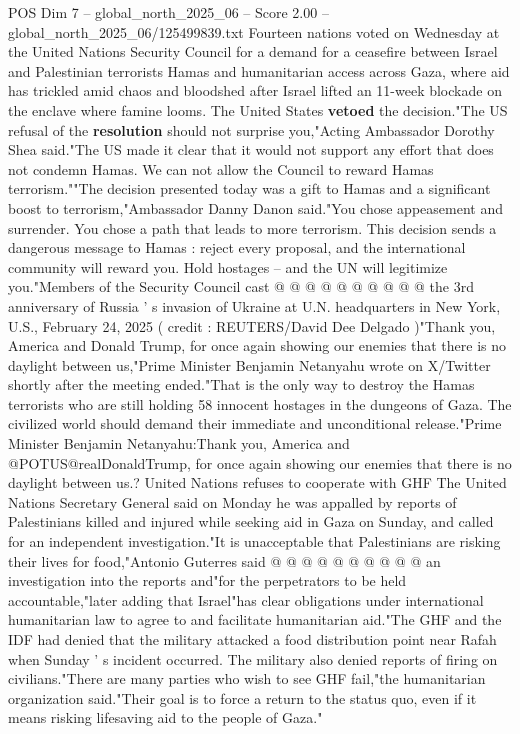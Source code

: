 \begin{textsample}{POS Dim 7 – global\_north\_2025\_06 – Score 2.00 – global\_north\_2025\_06/125499839.txt}  \label{ex:f7_pos_373}
Fourteen nations voted on Wednesday at the United Nations Security Council for a demand for a ceasefire between Israel and Palestinian terrorists Hamas and humanitarian access across Gaza, where aid has trickled amid chaos and bloodshed after Israel lifted an 11-week blockade on the enclave where famine looms.
The United States \textbf{vetoed} the decision."The US refusal of the \textbf{resolution} should not surprise you,"Acting Ambassador Dorothy Shea said."The US made it clear that it would not support any effort that does not condemn Hamas.
We can not allow the Council to reward Hamas terrorism.""The decision presented today was a gift to Hamas and a significant boost to terrorism,"Ambassador Danny Danon said."You chose appeasement and surrender.
You chose a path that leads to more terrorism.
This decision sends a dangerous message to Hamas : reject every proposal, and the international community will reward you.
Hold hostages -- and the UN will legitimize you."Members of the Security Council cast @ @ @ @ @ @ @ @ @ @ the 3rd anniversary of Russia ' s invasion of Ukraine at U.N. headquarters in New York, U.S., February 24, 2025 ( credit : REUTERS/David Dee Delgado )"Thank you, America and Donald Trump, for once again showing our enemies that there is no daylight between us,"Prime Minister Benjamin Netanyahu wrote on X/Twitter shortly after the meeting ended."That is the only way to destroy the Hamas terrorists who are still holding 58 innocent hostages in the dungeons of Gaza.
The civilized world should demand their immediate and unconditional release."Prime Minister Benjamin Netanyahu:Thank you, America and @POTUS@realDonaldTrump, for once again showing our enemies that there is no daylight between us.?
United Nations refuses to cooperate with GHF The United Nations Secretary General said on Monday he was appalled by reports of Palestinians killed and injured while seeking aid in Gaza on Sunday, and called for an independent investigation."It is unacceptable that Palestinians are risking their lives for food,"Antonio Guterres said @ @ @ @ @ @ @ @ @ @ an investigation into the reports and"for the perpetrators to be held accountable,"later adding that Israel"has clear obligations under international humanitarian law to agree to and facilitate humanitarian aid."The GHF and the IDF had denied that the military attacked a food distribution point near Rafah when Sunday ' s incident occurred.
The military also denied reports of firing on civilians."There are many parties who wish to see GHF fail,"the humanitarian organization said."Their goal is to force a return to the status quo, even if it means risking lifesaving aid to the people of Gaza."

\end{textsample}
